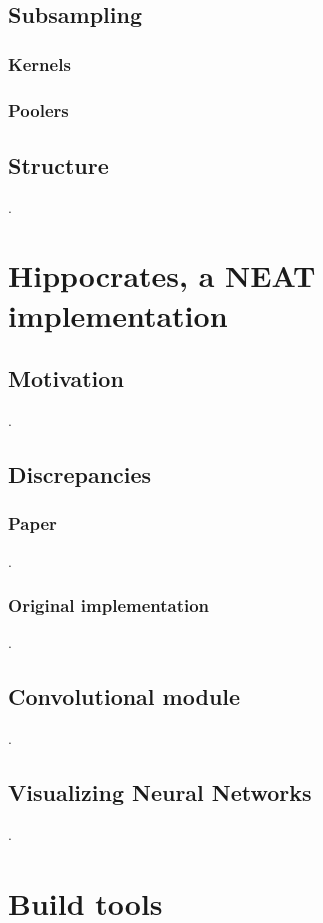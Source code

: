 \documentclass[11pt]{article}
\begin{document}
		\subsection{Subsampling}
			
			\subsubsection{Kernels}
			
			\subsubsection{Poolers}
			
		\subsection{Structure}
			.
	\newpage

	\section{Hippocrates, a NEAT implementation}
		\subsection{Motivation}
			.
		\subsection{Discrepancies}
			\subsubsection{Paper}
				.
			\subsubsection{Original implementation}
				.
		\subsection{Convolutional module}
			.
		\subsection{Visualizing Neural Networks}
			.
	\newpage

	\section{Build tools}
\end{document}

